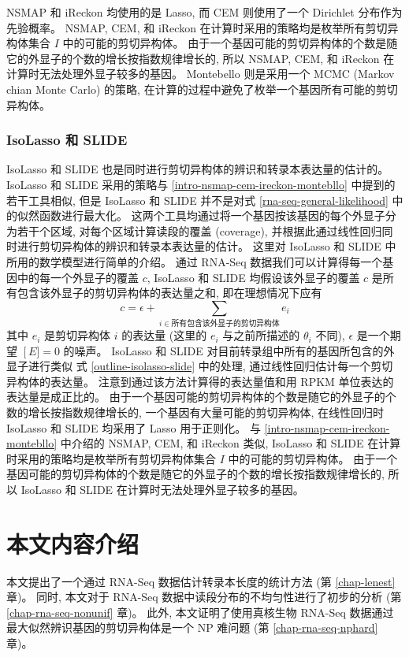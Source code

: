 NSMAP 和 iReckon 均使用的是 Lasso, 
而 CEM 则使用了一个 Dirichlet 分布作为先验概率。
NSMAP, CEM, 和 iReckon 在计算时采用的策略均是枚举所有剪切异构体集合 $I$ 中的可能的剪切异构体。 
由于一个基因可能的剪切异构体的个数是随它的外显子的个数的增长按指数规律增长的, 
所以 NSMAP, CEM, 和 iReckon 在计算时无法处理外显子较多的基因。 
Montebello 则是采用一个 MCMC (Markov chian Monte Carlo) \cite{robert2004monte} 的策略, 
在计算的过程中避免了枚举一个基因所有可能的剪切异构体。 

\subsubsection{IsoLasso 和 SLIDE}
IsoLasso 和 SLIDE 也是同时进行剪切异构体的辨识和转录本表达量的估计的。 
IsoLasso 和 SLIDE 采用的策略与 \ref{intro-nsmap-cem-ireckon-montebllo} 
中提到的若干工具相似, 但是 IsoLasso 和 SLIDE 并不是对式 
\eqref{rna-seq-general-likelihood} 中的似然函数进行最大化。 
这两个工具均通过将一个基因按该基因的每个外显子分为若干个区域, 
对每个区域计算读段的覆盖 (coverage), 
并根据此通过线性回归同时进行剪切异构体的辨识和转录本表达量的估计。 
这里对 IsoLasso 和 SLIDE 中所用的数学模型进行简单的介绍。 
通过 RNA-Seq 数据我们可以计算得每一个基因中的每一个外显子的覆盖 $c$, 
IsoLasso 和 SLIDE 均假设该外显子的覆盖 $c$ 是所有包含该外显子的剪切异构体的表达量之和, 
即在理想情况下应有
\begin{equation}
\label{outline-isolasso-slide}
c = \epsilon + \sum_{i \in \text{所有包含该外显子的剪切异构体}} e_i
\end{equation}
其中 $e_i$ 是剪切异构体 $i$ 的表达量 (这里的 $e_i$ 与之前所描述的 $\theta_i$ 不同), 
$\epsilon$ 是一个期望 $\operatorname[E] = 0$ 的噪声。 
IsoLasso 和 SLIDE 对目前转录组中所有的基因所包含的外显子进行类似 
式 \eqref{outline-isolasso-slide} 中的处理, 通过线性回归估计每一个剪切异构体的表达量。 
注意到通过该方法计算得的表达量值和用 RPKM 单位表达的表达量是成正比的。 
由于一个基因可能的剪切异构体的个数是随它的外显子的个数的增长按指数规律增长的, 
一个基因有大量可能的剪切异构体, 
在线性回归时 IsoLasso 和 SLIDE 均采用了 Lasso \cite{tibshirani1996regression} 用于正则化。 
与 \ref{intro-nsmap-cem-ireckon-montebllo} 中介绍的 NSMAP, CEM, 和 iReckon 类似, 
IsoLasso 和 SLIDE 在计算时采用的策略均是枚举所有剪切异构体集合 $I$ 中的可能的剪切异构体。 
由于一个基因可能的剪切异构体的个数是随它的外显子的个数的增长按指数规律增长的, 
所以 IsoLasso 和 SLIDE 在计算时无法处理外显子较多的基因。 

\section{本文内容介绍}
本文提出了一个通过 RNA-Seq 数据估计转录本长度的统计方法 (第 \ref{chap-lenest} 章)。 
同时, 本文对于 RNA-Seq 数据中读段分布的不均匀性进行了初步的分析 (第 \ref{chap-rna-seq-nonunif} 章)。 
此外, 本文证明了使用真核生物 RNA-Seq 数据通过最大似然辨识基因的剪切异构体是一个 NP 难问题 (第 \ref{chap-rna-seq-nphard} 章)。

